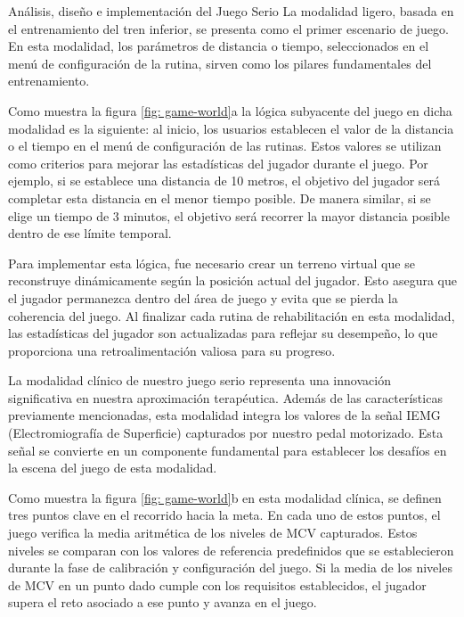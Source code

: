 \begin{thesischapter}{2} {Análisis, diseño e implementación del Juego Serio}
La modalidad ligero, basada en el entrenamiento del tren inferior, se presenta como el primer escenario de juego. En esta 
modalidad, los parámetros de distancia o tiempo, seleccionados en el menú de configuración de la rutina, sirven como los pilares 
fundamentales del entrenamiento.

\vspace{10pt}
Como muestra la figura \ref{fig: game-world}a la lógica subyacente del juego en dicha modalidad es la siguiente: al inicio, los usuarios establecen el valor de la distancia o el tiempo en el menú de configuración de las rutinas. Estos valores se utilizan como criterios para mejorar las estadísticas del jugador durante el juego. Por ejemplo, si se establece una distancia de 10 metros, el objetivo del jugador será completar esta distancia en el menor tiempo posible. De manera similar, si se elige un tiempo de 3 minutos, el objetivo será recorrer la mayor distancia posible dentro de ese límite temporal.

\vspace{10pt}
Para implementar esta lógica, fue necesario crear un terreno virtual que se reconstruye dinámicamente según la posición actual del jugador. Esto asegura que el jugador permanezca dentro del área de juego y evita que se pierda la coherencia del juego. Al finalizar cada rutina de rehabilitación en esta modalidad, las estadísticas del jugador son actualizadas para reflejar su desempeño, lo que proporciona una retroalimentación valiosa para su progreso.

La modalidad clínico de nuestro juego serio representa una innovación significativa en nuestra aproximación terapéutica. Además de las características previamente mencionadas, esta modalidad integra los valores de la señal IEMG (Electromiografía de Superficie) capturados por nuestro pedal motorizado. Esta señal se convierte en un componente fundamental para establecer los desafíos en la escena del juego de esta modalidad.

\vspace{10pt}
Como muestra la figura \ref{fig: game-world}b en esta modalidad clínica, se definen tres puntos clave en el recorrido hacia la meta. En cada uno de estos puntos, el juego verifica la media aritmética de los niveles de MCV capturados. Estos niveles se comparan con los valores de referencia predefinidos que se establecieron durante la fase de calibración y configuración del juego. Si la media de los niveles de MCV en un punto dado cumple con los requisitos establecidos, el jugador supera el reto asociado a ese punto y avanza en el juego.


\end{thesischapter}
